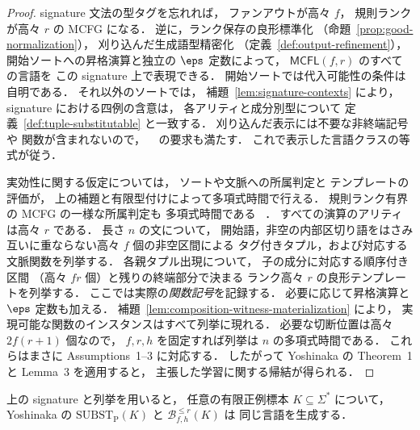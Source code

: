 \begin{proof}
signature 文法の型タグを忘れれば，
ファンアウトが高々 $f$，
規則ランクが高々 $r$ の MCFG になる．
逆に，ランク保存の良形標準化
（命題~\ref{prop:good-normalization}），
刈り込んだ生成語型精密化
（定義~\ref{def:output-refinement}），
開始ソートへの昇格演算と独立の $\eps$ 定数によって，
$\mathsf{MCFL}(f,r)$ のすべての言語を
この signature 上で表現できる．
開始ソートでは代入可能性の条件は自明である．
それ以外のソートでは，
補題~\ref{lem:signature-contexts} により，
signature における四例の含意は，
各アリティと成分別型について
定義~\ref{def:tuple-substitutable} と一致する．
刈り込んだ表示には不要な非終端記号や
関数が含まれないので，
~\cite[Section~6]{Yoshinaka2015General}
の要求も満たす．
これで表示した言語クラスの等式が従う．

実効性に関する仮定については，
ソートや文脈への所属判定と
テンプレートの評価が，
上の補題と有限型付けによって多項式時間で行える．
規則ランク有界の MCFG の一様な所属判定も
多項式時間である
~\cite[Proposition~4]{Yoshinaka2011}．
すべての演算のアリティは高々 $r$ である．
長さ $n$ の文について，
開始語，非空の内部区切り語をはさみ
互いに重ならない高々 $f$ 個の非空区間による
タグ付きタプル，および対応する文脈関数を列挙する．
各親タプル出現について，
子の成分に対応する順序付き区間
（高々 $fr$ 個）と残りの終端部分で決まる
ランク高々 $r$ の良形テンプレートを列挙する．
ここでは実際の\emph{関数記号}を記録する．
必要に応じて昇格演算と $\eps$ 定数も加える．
補題~\ref{lem:composition-witness-materialization} により，
実現可能な関数のインスタンスはすべて列挙に現れる．
必要な切断位置は高々 $2f(r+1)$ 個なので，
$f,r,h$ を固定すれば列挙は $n$ の多項式時間である．
これらはまさに Assumptions~1--3 に対応する．
したがって Yoshinaka の Theorem~1 と Lemma~3 を適用すると，
主張した学習に関する帰結が得られる．
\end{proof}

\begin{lemma}[部分構造添字付き再構成と型制約付き再構成]
\label{lem:substp}
上の signature と列挙を用いると，
任意の有限正例標本 $K\subseteq\Sigma^*$ について，
Yoshinaka の $\mathrm{SUBST}_{\mathrm P}(K)$ と
$\mathcal B^{\le r}_{f,h}(K)$ は
同じ言語を生成する．
\end{lemma}

